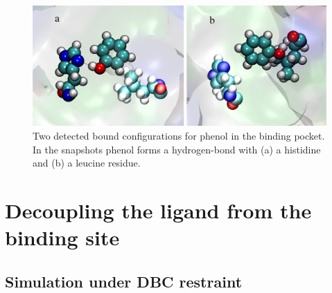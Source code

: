 \documentclass[9pt,tutorial]{livecoms}
\newcommand{\jh}[1]{\textcolor{blue}{JH: #1}}
\begin{document}
\begin{figure}[h!]
\centering
\includegraphics[width=\linewidth]{HSELEU}
\caption{Two detected bound configurations for phenol in the binding pocket. In the snapshots phenol forms a hydrogen-bond with (a) a histidine and (b) a leucine residue.}
\label{fig:snapshot}
\end{figure}


\section{Decoupling the ligand from the binding site}\label{section 7}

\subsection{Simulation under DBC restraint}\label{section 7.1}

\end{document}
